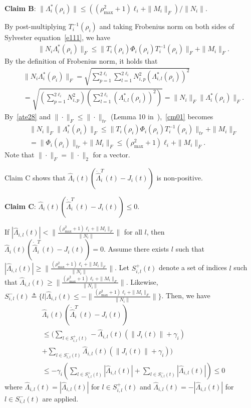 \documentclass[journal]{IEEEtran}
\newcommand{\nnum}{\nonumber}
\begin{document}
\textbf{Claim B}: 
$\|\Lambda_i^*(\rho_i)\| \leq ((\rho_{\max}^2+1) \ell_i + \|M_i\|_F)/\|N_i\|$.
\begin{IEEEproof}
By post-multiplying $T_i^{-1}(\rho_i)$ and taking Frobenius norm on both sides of Sylvester equation~\eqref{e111}, we have
\begin{align}
&\|N_i \Lambda_i^*(\rho_i)\|_F \leq \|T_i(\rho_i) \Phi_i(\rho_i) T_i^{-1}(\rho_i)\|_F +\|M_i\|_F.
\label{cm01}
\end{align}
By the definition of Frobenius norm, it holds that
\begin{align}
&\|N_i \Lambda_i^*(\rho_i)\|_F=\sqrt{\sum_{p=1}^{2\ell_i}\sum_{l=1}^{2\ell_i} N_{i,p}^2(\Lambda_{i,l}^*(\rho_i))^2}\nnum\\
&=\sqrt{(\sum_{p=1}^{2\ell_i} N_{i,p}^2)(\sum_{l=1}^{2\ell_i} (\Lambda_{i,l}^*(\rho_i))^2)}=\|N_i\|_F\| \Lambda_i^*(\rho_i) \|_{F}.
\label{ate28}
\end{align}
By~\eqref{ate28} and $\|\cdot\|_{F} \leq \|\cdot\|_{tr}$ (Lemma 10 in~\cite{srebro2004learning}),~\eqref{cm01} becomes
\begin{align*}
&\|N_i\|_F\|\Lambda_i^*(\rho_i)\|_F \leq \|T_i(\rho_i) \Phi_i(\rho_i) T_i^{-1}(\rho_i)\|_{tr} +\|M_i\|_F \nnum\\
&= \|\Phi_i(\rho_i) \|_{tr} +\|M_i\|_F \leq (\rho_{\max}^2+1) \ell_i + \|M_i\|_F.
\end{align*}
Note that $\|\cdot\|_F=\|\cdot\|_2$ for a vector.
\end{IEEEproof}

Claim C shows that $\hat{\Lambda}_{i}(t)(\dot{\hat{\Lambda}}_{i}^T(t)-J_{i}(t))$ is non-positive.

\textbf{Claim C}: $\hat{\Lambda}_{i}(t)(\dot{\hat{\Lambda}}_{i}^T(t)-J_{i}(t))\leq 0$.
\begin{IEEEproof}
If $|\hat{\Lambda}_{i,l}(t)| < \|\frac{(\rho_{\max}^2+1) \ell_i + \|M_i\|_F}{\|N_i\|}\|$ for all $l$, then $\hat{\Lambda}_{i}(t)(\dot{\hat{\Lambda}}_{i}^T(t)-J_{i}(t))= 0$. Assume there exists $l$ such that $|\hat{\Lambda}_{i,l}(t)| \geq \|\frac{(\rho_{\max}^2+1) \ell_i + \|M_i\|_F}{\|N_i\|}\|$.
Let $S^{+}_{i,l}(t)$ denote a set of indices $l$ such that $\hat{\Lambda}_{i,l}(t)\geq \|\frac{(\rho_{\max}^2+1) \ell_i + \|M_i\|_F}{\|N_i\|}\|$. Likewise, $S^{-}_{i,l}(t) \triangleq \{l|\hat{\Lambda}_{i,l}(t)\leq -\|\frac{(\rho_{\max}^2+1) \ell_i + \|M_i\|_F}{\|N_i\|}\|\}$.
Then, we have
\begin{align*}
&\hat{\Lambda}_{i}(t)(\dot{\hat{\Lambda}}_{i}^T(t)-J_{i}(t))\nnum\\
&\leq (\sum_{l \in S^{+}_{i,l}(t)}-\hat{\Lambda}_{i,l}(t)(\|J_{i}(t)\|+\gamma_i) \nnum\\
&+\sum_{l \in S^{-}_{i,l}(t)}\hat{\Lambda}_{i,l}(t)(\|J_{i}(t)\|+\gamma_i))\nnum\\
&\leq -\gamma_i(\sum_{l \in S^{+}_{i,l}(t)}|\hat{\Lambda}_{i,l}(t)| +\sum_{l \in S^{-}_{i,l}(t)}|\hat{\Lambda}_{i,l}(t)|)\leq0
\end{align*}
where $\hat{\Lambda}_{i,l}(t)=|\hat{\Lambda}_{i,l}(t)|$ for $l \in S^{+}_{i,l}(t)$ and $\hat{\Lambda}_{i,l}(t)=-|\hat{\Lambda}_{i,l}(t)|$ for $l \in S^{-}_{i,l}(t)$ are applied.
\end{IEEEproof}
\end{document}

